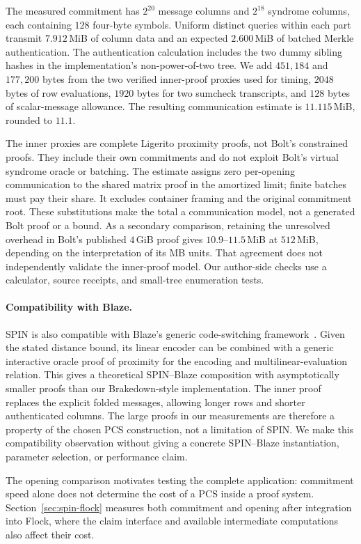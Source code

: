 The measured commitment has $2^{20}$ message columns and $2^{18}$
syndrome columns, each containing $128$ four-byte symbols.
Uniform distinct queries within each part transmit $7.912$\,MiB of
column data and an expected $2.600$\,MiB of batched Merkle authentication.
The authentication calculation includes the two dummy sibling hashes in
the implementation's non-power-of-two tree.
We add $451{,}184$ and $177{,}200$ bytes from the two verified inner-proof
proxies used for timing, $2048$ bytes of row evaluations, $1920$ bytes for
two sumcheck transcripts, and $128$ bytes of scalar-message allowance.
The resulting communication estimate is $11.115$\,MiB, rounded to $11.1$.

The inner proxies are complete Ligerito proximity proofs, not Bolt's
constrained proofs. They include their own commitments and do not exploit
Bolt's virtual syndrome oracle or batching. The estimate assigns zero
per-opening communication to the shared matrix proof in the amortized
limit; finite batches must pay their share. It excludes container framing
and the original commitment root. These substitutions make the total a
communication model, not a generated Bolt proof or a bound.
As a secondary comparison, retaining the unresolved overhead in Bolt's
published $4$\,GiB proof gives $10.9$--$11.5$\,MiB at $512$\,MiB,
depending on the interpretation of its MB units. That agreement does not
independently validate the inner-proof model. Our author-side checks use a calculator, source receipts, and
small-tree enumeration tests.

\paragraph{Compatibility with Blaze.}
SPIN is also compatible with Blaze's generic code-switching
framework~\cite{blaze25}. Given the stated distance bound, its linear
encoder can be combined with a generic interactive oracle proof of
proximity for the encoding and multilinear-evaluation relation. This
gives a theoretical SPIN--Blaze composition with asymptotically smaller
proofs than our Brakedown-style implementation. The inner proof replaces
the explicit folded messages, allowing longer rows and shorter
authenticated columns. The large proofs in our measurements are therefore
a property of the chosen PCS construction, not a limitation of SPIN.
We make this compatibility observation without giving a concrete
SPIN--Blaze instantiation, parameter selection, or performance claim.

The opening comparison motivates testing the complete application:
commitment speed alone does not determine the cost of a PCS inside a
proof system. Section~\ref{sec:spin-flock} measures both commitment and
opening after integration into Flock, where the claim interface and
available intermediate computations also affect their cost.
